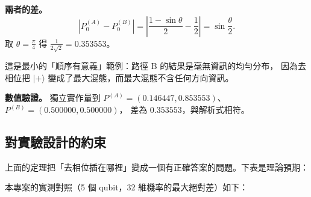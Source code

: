 \documentclass[11pt,a4paper]{ctexart}
\begin{document}
\textbf{兩者的差。}
\[|P_{0}^{(A)} - P_{0}^{(B)}| = |\frac{1 - \sin\theta}{2} - \frac{1}{2}| = \sin\frac{\theta}{2}.\]
取 \(\theta = \frac{\pi}{4}\) 得 \(\frac{1}{2\sqrt{2}} = 0.353553\)。

這是最小的「順序有意義」範例：路徑 B 的結果是毫無資訊的均勻分布，
因為去相位把 \(| + \rangle\)
變成了最大混態，而最大混態不含任何方向資訊。

\textbf{數值驗證。} 獨立實作量到
\(P^{(A)} = (0.146447,0.853553)\)、\(P^{(B)} = (0.500000,0.500000)\)，
差為 \(0.353553\)，與解析式相符。

\subsection{對實驗設計的約束}

上面的定理把「去相位插在哪裡」變成一個有正確答案的問題。下表是理論預期：

\begin{table}[t]
\centering
\caption{去相位三種插入位置的理論預期。前兩列是「零的定理」，不是實驗失敗。}
\end{table}


本專案的實測對照（5 個 qubit，32 維機率的最大絕對差）如下：
\end{document}
